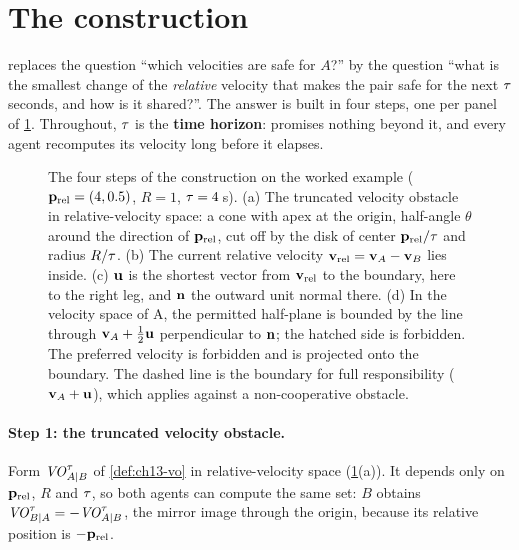 \section{The \orca construction}
\label{sec:ch13-orca}

\orca replaces the question ``which velocities are safe for $A$?'' by the
question ``what is the smallest change of the \emph{relative} velocity that
makes the pair safe for the next $\tau$ seconds, and how is it shared?''.
The answer is built in four steps, one per panel of
\cref{fig:ch13-orca-construction}. Throughout, $\tau$ is the
\textbf{time horizon}: \orca promises nothing beyond
it, and every agent recomputes its velocity long before it elapses.

\begin{figure}[tb]
  \centering
  \caption{The four steps of the \orca construction on the worked example
  ($\mathbf{p}_{\mathrm{rel}} = (4, 0.5)$, $R = 1$, $\tau = 4$\,s). (a) The
  truncated velocity obstacle in relative-velocity space: a cone with apex
  at the origin, half-angle $\theta$ around the direction of
  $\mathbf{p}_{\mathrm{rel}}$, cut off by the disk of center $\mathbf{p}_{\mathrm{rel}}/\tau$
  and radius $R/\tau$. (b) The current relative velocity
  $\mathbf{v}_{\mathrm{rel}} = \mathbf{v}_A - \mathbf{v}_B$ lies inside. (c) $\mathbf{u}$ is the
  shortest vector from $\mathbf{v}_{\mathrm{rel}}$ to the boundary, here to the
  right leg, and $\mathbf{n}$ the outward unit normal there. (d) In the
  velocity space of A, the permitted half-plane is bounded by the line through
  $\mathbf{v}_A + \tfrac12\mathbf{u}$ perpendicular to $\mathbf{n}$; the hatched side
  is forbidden. The preferred velocity is forbidden and is projected onto the
  boundary. The dashed line is the boundary for full responsibility
  ($\mathbf{v}_A + \mathbf{u}$), which applies against a non-cooperative obstacle.}
  \label{fig:ch13-orca-construction}
\end{figure}

\paragraph{Step 1: the truncated velocity obstacle.}
Form $\mathit{VO}^{\tau}_{A|B}$ of \cref{def:ch13-vo} in relative-velocity space
(\cref{fig:ch13-orca-construction}(a)). It depends only on
$\mathbf{p}_{\mathrm{rel}}$, $R$ and $\tau$, so both agents can compute the
same set: $B$ obtains $\mathit{VO}^{\tau}_{B|A} = -\mathit{VO}^{\tau}_{A|B}$, the mirror
image through the origin, because its relative position is
$-\mathbf{p}_{\mathrm{rel}}$.

